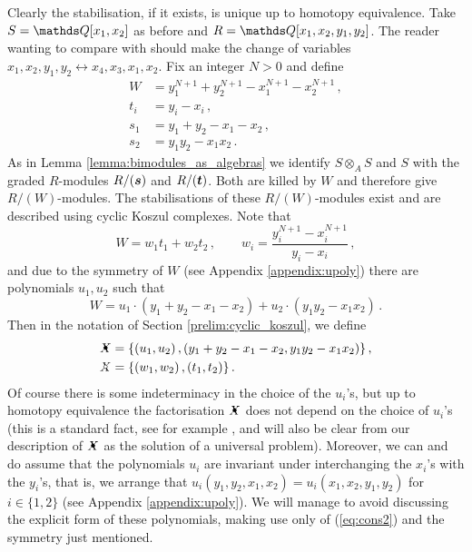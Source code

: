 \documentclass{compositio}
\theoremstyle{definition}
\numberwithin{equation}{section}
\begin{document}
Clearly the stabilisation, if it exists, is unique up to homotopy equivalence. Take $S = \QQ[x_1,x_2]$ as before and $R = \QQ[x_1,x_2,y_1,y_2]$. The reader wanting to compare with \cite[Section 6]{kr0401268} should make the change of variables $x_1,x_2,y_1,y_2 \leftrightarrow x_4,x_3,x_1,x_2$. Fix an integer $N > 0$ and define
\begin{align*}
W &= y_1^{N+1} + y_2^{N+1} - x_1^{N+1} - x_2^{N+1}\,,\\
t_i &= y_i - x_i\,,\\
s_1 &= y_1 + y_2 - x_1 - x_2\,,\\
s_2 &= y_1 y_2 - x_1 x_2\,.
\end{align*}
As in Lemma \ref{lemma:bimodules_as_algebras} we identify $S \otimes_A S$ and $S$ with the graded $R$-modules $R/(\boldsymbol{s})$ and $R/(\boldsymbol{t})$. Both are killed by $W$ and therefore give $R/(W)$-modules. The stabilisations of these $R/(W)$-modules exist and are described using cyclic Koszul complexes. Note that
\begin{equation}\label{eq:cons1}
W = w_1 t_1 + w_2 t_2 \, , \qquad w_i = \frac{y_i^{N+1} - x_i^{N+1}}{y_i - x_i} \, ,
\end{equation}
and due to the symmetry of $W$ (see Appendix \ref{appendix:upoly}) there are polynomials $u_1,u_2$ such that
\begin{equation}\label{eq:cons2}
W = u_1 \cdot ( y_1 + y_2 - x_1 - x_2 ) + u_2 \cdot ( y_1 y_2 - x_1 x_2 ) \, .
\end{equation}
Then in the notation of Section \ref{prelim:cyclic_koszul}, we define
\begin{align}
\Xbul &= \{ (u_1, u_2)\, , (y_1 + y_2 - x_1 - x_2, y_1 y_2 - x_1 x_2) \} \, , \nonumber \\
\Xcirc &= \{ (w_1, w_2) \, , (t_1, t_2) \}\,. \label{XbulXcirc}
\end{align}
Of course there is some indeterminacy in the choice of the $u_i$'s, but up to homotopy equivalence the factorisation $\Xbul$ does not depend on the choice of $u_i$'s (this is a standard fact, see for example \cite{??}, and will also be clear from our description of $\Xbul$ as the solution of a universal problem). Moreover, we can and do assume that the polynomials $u_i$ are invariant under interchanging the $x_{i}$'s with the $y_{i}$'s, that is, we arrange that $u_i(y_1,y_2,x_1,x_2) = u_i(x_1,x_2,y_1,y_2)$ for $i \in \{ 1,2 \}$ (see Appendix \ref{appendix:upoly}). We will manage to avoid discussing the explicit form of these polynomials, making use only of (\ref{eq:cons2}) and the symmetry just mentioned.
\end{document}
